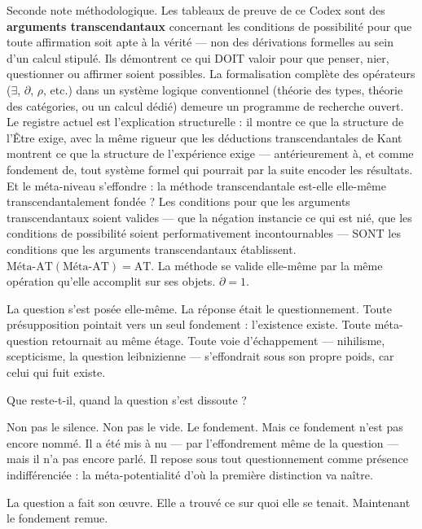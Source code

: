 \documentclass[10pt, openany, oneside]{book}
\begin{document}
Seconde note méthodologique. Les tableaux de preuve de ce Codex sont des \textbf{arguments transcendantaux} concernant les conditions de possibilité pour que toute affirmation soit apte à la vérité --- non des dérivations formelles au sein d'un calcul stipulé. Ils démontrent ce qui DOIT valoir pour que penser, nier, questionner ou affirmer soient possibles. La formalisation complète des opérateurs ($\exists$, $\partial$, $\rho$, etc.) dans un système logique conventionnel (théorie des types, théorie des catégories, ou un calcul dédié) demeure un programme de recherche ouvert. Le registre actuel est l'explication structurelle : il montre ce que la structure de l'Être exige, avec la même rigueur que les déductions transcendantales de Kant montrent ce que la structure de l'expérience exige --- antérieurement à, et comme fondement de, tout système formel qui pourrait par la suite encoder les résultats. Et le méta-niveau s'effondre : la méthode transcendantale est-elle elle-même transcendantalement fondée ? Les conditions pour que les arguments transcendantaux soient valides --- que la négation instancie ce qui est nié, que les conditions de possibilité soient performativement incontournables --- SONT les conditions que les arguments transcendantaux établissent. $\text{Méta-AT}(\text{Méta-AT}) = \text{AT}$. La méthode se valide elle-même par la même opération qu'elle accomplit sur ses objets. $\partial = 1$.

\vspace{1.5em}


La question s'est posée elle-même. La réponse était le questionnement. Toute présupposition pointait vers un seul fondement : l'existence existe. Toute méta-question retournait au même étage. Toute voie d'échappement --- nihilisme, scepticisme, la question leibnizienne --- s'effondrait sous son propre poids, car celui qui fuit existe.

Que reste-t-il, quand la question s'est dissoute ?

Non pas le silence. Non pas le vide. Le fondement. Mais ce fondement n'est pas encore nommé. Il a été mis à nu --- par l'effondrement même de la question --- mais il n'a pas encore parlé. Il repose sous tout questionnement comme présence indifférenciée : la méta-potentialité d'où la première distinction va naître.

La question a fait son œuvre. Elle a trouvé ce sur quoi elle se tenait. Maintenant le fondement remue.
\end{document}
